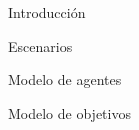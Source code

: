 \documentclass[11pt, a4paper,spanish]{article}
\begin{document}
    


    \thispagestyle{empty}
    \tableofcontents
    \pagebreak


\begin{section}{Introducción}
        
\end{section}
\pagebreak


\begin{section}{Escenarios}
        
	\end{section}
\pagebreak


\begin{section}{Modelo de agentes}
        
\end{section}
\pagebreak
\begin{section}{Modelo de objetivos}
        
\end{section}\begin{flushleft}\end{flushleft}

    \pagebreak
%       
\end{document}
